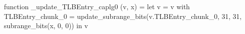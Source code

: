 function _update_TLBEntry_caplg0 (v, x) = let v = { v with TLBEntry_chunk_0 = update_subrange_bits(v.TLBEntry_chunk_0, 31, 31, subrange_bits(x, 0, 0)) } in
  v
